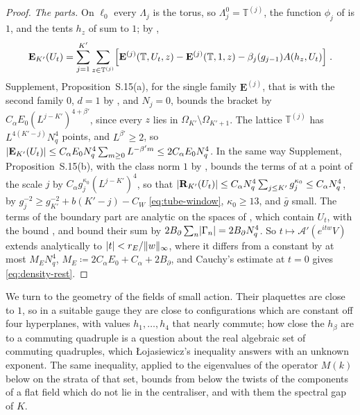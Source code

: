 \documentclass[11pt]{preprint}
\DeclarePairedDelimiter{\abs}{\lvert}{\rvert}
\DeclarePairedDelimiter{\norm}{\lVert}{\rVert}
\numberwithin{equation}{section}
\theoremstyle{definition}
\theoremstyle{remark}
\theoremstyle{plain}
\begin{document}
\begin{proof}
\emph{The parts.} On $\ell_0$ every $\Lambda_j$ is the torus, so $\Lambda^0_j = \mathbb T^{(j)}$, the function $\phi_j$ of \cite[(2.25), p.~259]{BalabanCRE} is $1$, and the tents $h_z$ of \cite[p.~283]{BalabanCRE} sum to $1$; by \cite[(2.25)--(2.26)]{BalabanCRE},
\begin{equation}\label{eq:regular-part-points}
    \mathbf E_{K'}(U_t) = \sum_{j=1}^{K'}\sum_{z \in \mathbb T^{(j)}}\Bigl[\mathbf E^{(j)}(\mathbb T, U_t, z) - \mathbf E^{(j)}(\mathbb T, 1, z) - \beta_j(g_{j-1})A(h_z, U_t)\Bigr]\;.
\end{equation}
Supplement, Proposition~S.15(a), for the single family $\mathbf E^{(j)}$, that is with the second family $0$, $d = 1$ by \cite[(1.18), p.~263]{BalabanRG1}, and $N_j = 0$, bounds the bracket by $C_\alpha E_0(L^{j-K'})^{4+\beta'}$, since every $z$ lies in $\Omega_{K'} \setminus \Omega_{K'+1}$. The lattice $\mathbb T^{(j)}$ has $L^{4(K'-j)}N_q^4$ points, and $L^{\beta'} \geq 2$, so $\abs{\mathbf E_{K'}(U_t)} \leq C_\alpha E_0N_q^4\sum_{m \geq 0}L^{-\beta'm} \leq 2C_\alpha E_0N_q^4$. In the same way Supplement, Proposition~S.15(b), with the class norm $1$ by \cite[(2.31), p.~260]{BalabanCRE}, bounds the terms of \cite[(2.30)]{BalabanCRE} at a point of the scale $j$ by $C_\alpha g_j^{\kappa_0}(L^{j-K'})^4$, so that $\abs{\mathbf R_{K'}(U_t)} \leq C_\alpha N_q^4\sum_{j \leq K'}g_j^{\kappa_0} \leq C_\alpha N_q^4$, by $g_j^{-2} \geq g_{K'}^{-2} + b(K' - j) - C_W$ \eqref{eq:tube-window}, $\kappa_0 \geq 13$, and $\bar g$ small. The terms of the boundary part are analytic on the spaces of \cite[pp.~261--262]{BalabanCRE}, which contain $U_t$, with the bound \cite[(2.42)]{BalabanCRE}, and \cite[(2.47)--(2.48), p.~264]{BalabanCRE} bound their sum by $2B_\partial\sum_n\abs{\Gamma_n} = 2B_\partial N_q^4$. So $t \mapsto \mathcal A'(e^{itw}V)$ extends analytically to $\abs t < r_E/\norm w_\infty$, where it differs from a constant by at most $M_EN_q^4$, $M_E \coloneqq 2C_\alpha E_0 + C_\alpha + 2B_\partial$, and Cauchy's estimate at $t = 0$ gives \eqref{eq:density-rest}.
\end{proof}

We turn to the geometry of the fields of small action. Their plaquettes are close to $1$, so in a suitable gauge they are close to configurations which are constant off four hyperplanes, with values $h_1, \dots, h_4$ that nearly commute; how close the $h_\beta$ are to a commuting quadruple is a question about the real algebraic set of commuting quadruples, which {\L}ojasiewicz's inequality answers with an unknown exponent. The same inequality, applied to the eigenvalues of the operator $M(k)$ below on the strata of that set, bounds from below the twists of the components of a flat field which do not lie in the centraliser, and with them the spectral gap of $K$.
\end{document}
